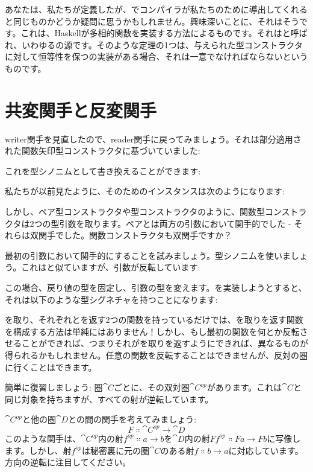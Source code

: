 あなたは、私たちが定義したが、でコンパイラが私たちのために導出してくれると同じものかどうか疑問に思うかもしれません。興味深いことに、それはそうです。これは、Haskellが多相的関数を実装する方法によるものです。それはと呼ばれ、いわゆるの源です。そのような定理の1つは、与えられた型コンストラクタに対して恒等性を保つの実装がある場合、それは一意でなければならないというものです。

\section{共変関手と反変関手}

writer関手を見直したので、reader関手に戻ってみましょう。それは部分適用された関数矢印型コンストラクタに基づいていました: 

これを型シノニムとして書き換えることができます: 

私たちが以前見たように、そのためのインスタンスは次のようになります: 

しかし、ペア型コンストラクタや型コンストラクタのように、関数型コンストラクタは2つの型引数を取ります。ペアとは両方の引数において関手的でした - それらは双関手でした。関数コンストラクタも双関手ですか？

最初の引数において関手的にすることを試みましょう。型シノニムを使いましょう。これはと似ていますが、引数が反転しています: 

この場合、戻り値の型を固定し、引数の型を変えます。を実装しようとすると、それは以下のような型シグネチャを持つことになります: 

を取り、それぞれとを返す2つの関数を持っているだけでは、を取りを返す関数を構成する方法は単純にはありません！しかし、もし最初の関数を何とか反転させることができれば、つまりそれがを取りを返すようにできれば、異なるものが得られるかもしれません。任意の関数を反転することはできませんが、反対の圏に行くことはできます。

簡単に復習しましょう: 圏$\cat{C}$ごとに、その双対圏$\cat{C}^\mathit{op}$があります。これは$\cat{C}$と同じ対象を持ちますが、すべての射が逆転しています。

$\cat{C}^\mathit{op}$と他の圏$\cat{D}$との間の関手を考えてみましょう: 
\[F \Colon \cat{C}^\mathit{op} \to \cat{D}\]
このような関手は、$\cat{C}^\mathit{op}$内の射$f^\mathit{op} \Colon a \to b$を$\cat{D}$内の射$F f^\mathit{op} \Colon F a \to F b$に写像します。しかし、射$f^\mathit{op}$は秘密裏に元の圏$\cat{C}$のある射$f \Colon b \to a$に対応しています。方向の逆転に注目してください。

